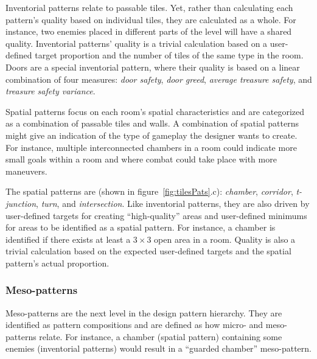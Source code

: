 Inventorial patterns relate to passable tiles. Yet, rather than calculating each pattern's quality based on individual tiles, they are calculated as a whole. For instance, two enemies placed in different parts of the level will have a shared quality. Inventorial patterns' quality is a trivial calculation based on a user-defined target proportion and the number of tiles of the same type in the room. Doors are a special inventorial pattern, where their quality is based on a linear combination of four measures: \emph{door safety}, \emph{door greed}, \emph{average treasure safety}, and \emph{treasure safety variance}.

Spatial patterns focus on each room's spatial characteristics and are categorized as a combination of passable tiles and walls. A combination of spatial patterns might give an indication of the type of gameplay the designer wants to create. For instance, multiple interconnected chambers in a room could indicate more small goals within a room and where combat could take place with more maneuvers.

The spatial patterns are (shown in figure~\ref{fig:tilesPats}.c): \emph{chamber}, \emph{corridor}, \emph{t-junction}, \emph{turn}, and \emph{intersection}. Like inventorial patterns, they are also driven by user-defined targets for creating ``high-quality'' areas and user-defined minimums for areas to be identified as a spatial pattern. For instance, a chamber is identified if there exists at least a $3 \times 3$ open area in a room. Quality is also a trivial calculation based on the expected user-defined targets and the spatial pattern's actual proportion.

 
\subsubsection{Meso-patterns}

Meso-patterns are the next level in the design pattern hierarchy. They are identified as pattern compositions and are defined as how micro- and meso-patterns relate. For instance, a chamber (spatial pattern) containing some enemies (inventorial patterns) would result in a ``guarded chamber'' meso-pattern.

